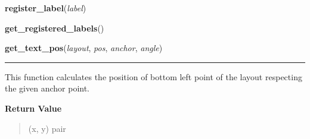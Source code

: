     \label{pygtk_chart:label:register_label}

    \vspace{0.5ex}

\hspace{.8\funcindent}\begin{boxedminipage}{\funcwidth}

    \raggedright \textbf{register\_label}(\textit{label})

\setlength{\parskip}{2ex}
\setlength{\parskip}{1ex}
    \end{boxedminipage}

    \label{pygtk_chart:label:get_registered_labels}

    \vspace{0.5ex}

\hspace{.8\funcindent}\begin{boxedminipage}{\funcwidth}

    \raggedright \textbf{get\_registered\_labels}()

\setlength{\parskip}{2ex}
\setlength{\parskip}{1ex}
    \end{boxedminipage}

    \label{pygtk_chart:label:get_text_pos}

    \vspace{0.5ex}

\hspace{.8\funcindent}\begin{boxedminipage}{\funcwidth}

    \raggedright \textbf{get\_text\_pos}(\textit{layout}, \textit{pos}, \textit{anchor}, \textit{angle})

    \vspace{-1.5ex}

    \rule{\textwidth}{0.5\fboxrule}
\setlength{\parskip}{2ex}
    This function calculates the position of bottom left point of the 
    layout respecting the given anchor point.

\setlength{\parskip}{1ex}
      \textbf{Return Value}
    \vspace{-1ex}

      \begin{quote}
      (x, y) pair

      \end{quote}

    \end{boxedminipage}


